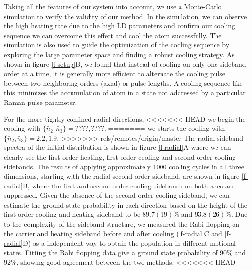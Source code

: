 \documentclass[aps,prl,twocolumn,groupedaddress]{revtex4-1}
\begin{document}
Taking all the features of our system into account, we use a Monte-Carlo simulation to verify
the validity of our method.
In the simulation, we can observe the high heating rate due to the high LD parameters
and confirm our cooling sequence we can
overcome this effect and cool the atom successfully.
The simulation is also used to guide the optimization of the cooling sequence by exploring the
large parameter space and finding a robust cooling strategy. As shown in figure \ref{f-setup}B,
we found that instead of cooling on only one sideband order at a time, it is generally more
efficient to alternate the cooling pulse between two neighboring orders (axial) or pulse lengths.
A cooling sequence like this minimizes the accumulation of atom in a state not addressed by a
particular Raman pulse parameter.

For the more tightly confined radial directions,
<<<<<<< HEAD
we begin the cooling with $\{\bar n_2, \bar n_3\}=????, ????$.
=======
we starts the cooling with $\{\bar n_2, \bar n_3\}=2.2, 1.9$.
>>>>>>> refs/remotes/origin/master
The radial sideband spectra of the initial distribution is shown in figure \ref{f-radial}A
where we can clearly see the first order heating, first order cooling and
second order cooling sidebands.
The results of applying approximately 1000 cooling cycles in all three dimensions,
starting with the radial second order sideband,
are shown in figure \ref{f-radial}B,
where the first and second order cooling sidebands on both axes are suppressed.
Given the absence of the second order cooling sideband,
we can estimate the ground state probability in each direction based on the height of
the first order cooling and heating sideband to be $89.7(19)\%$ and $93.8(26)\%$.
Due to the complexity of the sideband structure,
we measured the Rabi flopping on the carrier and heating sideband before and after cooling
(\ref{f-radial}C and \ref{f-radial}D)
as a independent way to obtain the population in different motional states.
Fitting the Rabi flopping data give a ground state probability of $90\%$ and $92\%$,
showing good agreement between the two methods.
<<<<<<< HEAD
\end{document}
